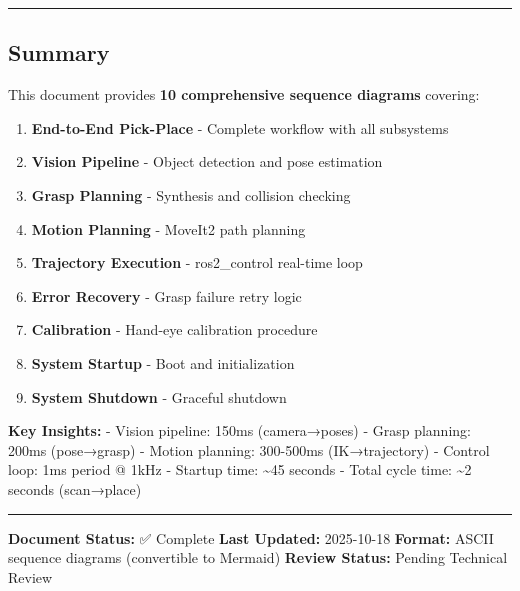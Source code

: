 \documentclass[
]{article}
\providecommand{\tightlist}{%
  \setlength{\itemsep}{0pt}\setlength{\parskip}{0pt}}
\begin{document}
\begin{center}\rule{0.5\linewidth}{0.5pt}\end{center}

\hypertarget{summary}{%
\subsection{Summary}\label{summary}}

This document provides \textbf{10 comprehensive sequence diagrams}
covering:

\begin{enumerate}
\def\labelenumi{\arabic{enumi}.}
\tightlist
\item
  \textbf{End-to-End Pick-Place} - Complete workflow with all subsystems
\item
  \textbf{Vision Pipeline} - Object detection and pose estimation
\item
  \textbf{Grasp Planning} - Synthesis and collision checking
\item
  \textbf{Motion Planning} - MoveIt2 path planning
\item
  \textbf{Trajectory Execution} - ros2\_control real-time loop
\item
  \textbf{Error Recovery} - Grasp failure retry logic
\item
  \textbf{Calibration} - Hand-eye calibration procedure
\item
  \textbf{System Startup} - Boot and initialization
\item
  \textbf{System Shutdown} - Graceful shutdown
\end{enumerate}

\textbf{Key Insights:} - Vision pipeline: 150ms (camera→poses) - Grasp
planning: 200ms (pose→grasp) - Motion planning: 300-500ms
(IK→trajectory) - Control loop: 1ms period @ 1kHz - Startup time:
\textasciitilde45 seconds - Total cycle time: \textasciitilde2 seconds
(scan→place)

\begin{center}\rule{0.5\linewidth}{0.5pt}\end{center}

\textbf{Document Status:} ✅ Complete \textbf{Last Updated:} 2025-10-18
\textbf{Format:} ASCII sequence diagrams (convertible to Mermaid)
\textbf{Review Status:} Pending Technical Review
\end{document}
